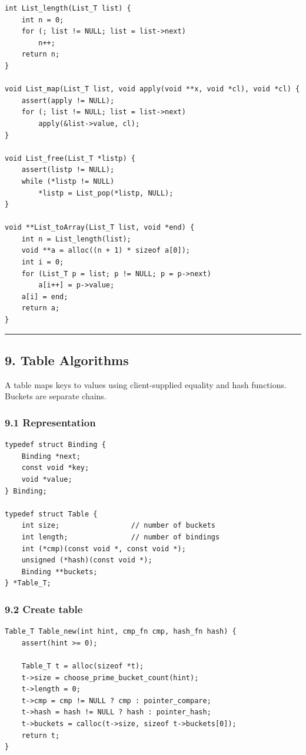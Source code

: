 \documentclass[11pt]{article}
\begin{document}
\begin{verbatim}
int List_length(List_T list) {
    int n = 0;
    for (; list != NULL; list = list->next)
        n++;
    return n;
}

void List_map(List_T list, void apply(void **x, void *cl), void *cl) {
    assert(apply != NULL);
    for (; list != NULL; list = list->next)
        apply(&list->value, cl);
}

void List_free(List_T *listp) {
    assert(listp != NULL);
    while (*listp != NULL)
        *listp = List_pop(*listp, NULL);
}

void **List_toArray(List_T list, void *end) {
    int n = List_length(list);
    void **a = alloc((n + 1) * sizeof a[0]);
    int i = 0;
    for (List_T p = list; p != NULL; p = p->next)
        a[i++] = p->value;
    a[i] = end;
    return a;
}
\end{verbatim}

\begin{center}\rule{0.5\linewidth}{0.5pt}\end{center}

\subsection{9. Table Algorithms}\label{table-algorithms}

A table maps keys to values using client-supplied equality and hash functions. Buckets are separate chains.

\subsubsection{9.1 Representation}\label{representation-1}

\begin{verbatim}
typedef struct Binding {
    Binding *next;
    const void *key;
    void *value;
} Binding;

typedef struct Table {
    int size;                 // number of buckets
    int length;               // number of bindings
    int (*cmp)(const void *, const void *);
    unsigned (*hash)(const void *);
    Binding **buckets;
} *Table_T;
\end{verbatim}

\subsubsection{9.2 Create table}\label{create-table}

\begin{verbatim}
Table_T Table_new(int hint, cmp_fn cmp, hash_fn hash) {
    assert(hint >= 0);

    Table_T t = alloc(sizeof *t);
    t->size = choose_prime_bucket_count(hint);
    t->length = 0;
    t->cmp = cmp != NULL ? cmp : pointer_compare;
    t->hash = hash != NULL ? hash : pointer_hash;
    t->buckets = calloc(t->size, sizeof t->buckets[0]);
    return t;
}
\end{verbatim}
\end{document}
